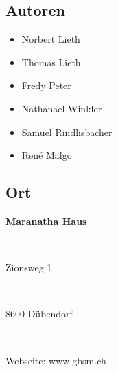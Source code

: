 \subsection{Autoren}
\begin{itemize}
    \item Norbert Lieth
    \item Thomas Lieth
    \item Fredy Peter
    \item Nathanael Winkler
    \item Samuel Rindlisbacher
    \item René Malgo
\end{itemize}
\subsection{Ort}
\parbox{3.5in}{\textbf{Maranatha Haus}}\\
\parbox{3.5in}{Zionsweg 1} \\
\parbox{3.5in}{8600 Dübendorf} \\
\parbox{3.5in}{Webseite: www.gbsm.ch}